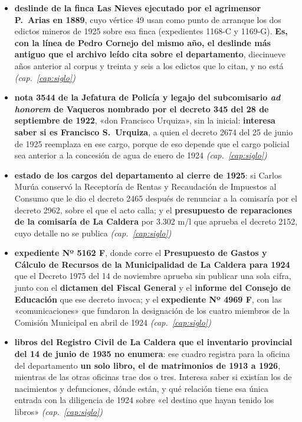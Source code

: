 \begin{itemize}[leftmargin=*]
\item \textbf{deslinde de la finca Las Nieves ejecutado por el agrimensor P.\ Arias en 1889}, cuyo vértice 49 usan como punto de arranque los dos edictos mineros de 1925 sobre esa finca (expedientes 1168-C y 1169-G). \textbf{Es, con la línea de Pedro Cornejo del mismo año, el deslinde más antiguo que el archivo leído cita sobre el departamento}, diecinueve años anterior al corpus y treinta y seis a los edictos que lo citan, y no está \textit{(cap.\ \ref{cap:siglo})}
\item \textbf{nota 3544 de la Jefatura de Policía y legajo del subcomisario \textit{ad honorem} de Vaqueros nombrado por el decreto 345 del 28 de septiembre de 1922}, «don Francisco Urquiza», sin la inicial: \textbf{interesa saber si es Francisco S.\ Urquiza}, a quien el decreto 2674 del 25 de junio de 1925 reemplaza en ese cargo, porque de eso depende que el cargo policial sea anterior a la concesión de agua de enero de 1924 \textit{(cap.\ \ref{cap:siglo})}
\item \textbf{estado de los cargos del departamento al cierre de 1925}: si Carlos Murúa conservó la Receptoría de Rentas y Recaudación de Impuestos al Consumo que le dio el decreto 2465 después de renunciar a la comisaría por el decreto 2962, sobre el que el acto calla; y el \textbf{presupuesto de reparaciones de la comisaría de La Caldera} por 3.302 m/l que aprueba el decreto 2152, cuyo detalle no se publica \textit{(cap.\ \ref{cap:siglo})}
\item \textbf{expediente Nº 5162 F}, donde corre el \textbf{Presupuesto de Gastos y Cálculo de Recursos de la Municipalidad de La Caldera para 1924} que el Decreto 1975 del 14 de noviembre aprueba sin publicar una sola cifra, junto con el \textbf{dictamen del Fiscal General} y el \textbf{informe del Consejo de Educación} que ese decreto invoca; y el \textbf{expediente Nº 4969 F}, con las «comunicaciones» que fundaron la designación de los cuatro miembros de la Comisión Municipal en abril de 1924 \textit{(cap.\ \ref{cap:siglo})}
\item \textbf{libros del Registro Civil de La Caldera que el inventario provincial del 14 de junio de 1935 no enumera}: ese cuadro registra para la oficina del departamento \textbf{un solo libro, el de matrimonios de 1913 a 1926}, mientras de las otras oficinas trae dos o tres. Interesa saber si existían los de nacimientos y defunciones, dónde están, y qué relación tiene esa única entrada con la diligencia de 1924 sobre «el destino que hayan tenido los libros» \textit{(cap.\ \ref{cap:siglo})}

\end{itemize}
